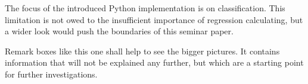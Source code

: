 The focus of the introduced Python implementation is on classification. This limitation is not owed to the insufficient importance of regression calculating, but a wider look would push the boundaries of this seminar paper.   

\begin{remark}
    Remark boxes like this one shall help to see the bigger pictures. It contains information that will not be explained any further, but which are a starting point for further investigations.
\end{remark}




\newpage
